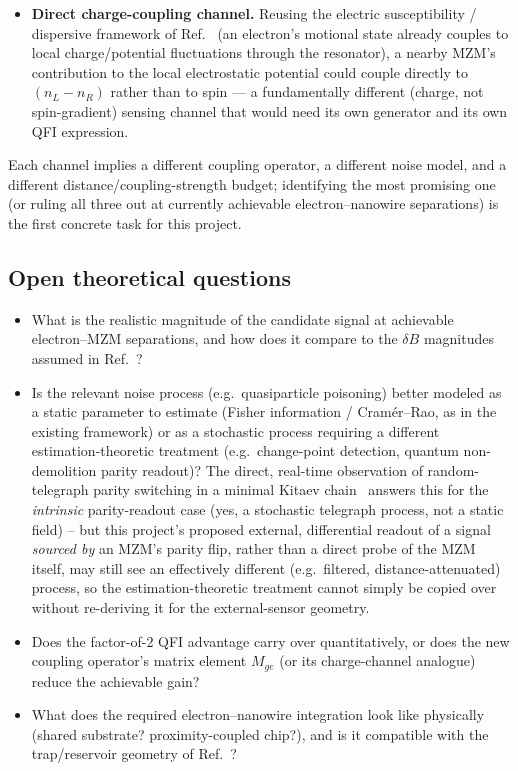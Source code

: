 \documentclass[aps,pra,reprint,superscriptaddress,longbibliography]{revtex4-2}
\begin{document}
\begin{itemize}
  distribution or edge current), this maps most directly onto the existing $\delta B$ channel and
  requires the smallest change to the Ref.~\cite{perruzza2026} formalism.
  \item \textbf{Direct charge-coupling channel.} Reusing the electric susceptibility / dispersive
  framework of Ref.~\cite{castoria2025} (an electron's motional state already couples to local
  charge/potential fluctuations through the resonator), a nearby MZM's contribution to the local
  electrostatic potential could couple directly to $(n_L - n_R)$ rather than to spin — a fundamentally
  different (charge, not spin-gradient) sensing channel that would need its own generator and its own
  QFI expression.
\end{itemize}

Each channel implies a different coupling operator, a different noise model, and a different
distance/coupling-strength budget; identifying the most promising one (or ruling all three out at
currently achievable electron--nanowire separations) is the first concrete task for this project.

\subsection{Open theoretical questions}

\begin{itemize}
  \item What is the realistic magnitude of the candidate signal at achievable electron--MZM
  separations, and how does it compare to the $\delta B$ magnitudes assumed in
  Ref.~\cite{perruzza2026}?
  \item Is the relevant noise process (e.g.\ quasiparticle poisoning) better modeled as a static
  parameter to estimate (Fisher information / Cram\'er--Rao, as in the existing framework) or as a
  stochastic process requiring a different estimation-theoretic treatment (e.g.\ change-point
  detection, quantum non-demolition parity readout)? The direct, real-time observation of random-
  telegraph parity switching in a minimal Kitaev chain~\cite{vanloo2026kitaev} answers this for the
  \emph{intrinsic} parity-readout case (yes, a stochastic telegraph process, not a static field) --
  but this project's proposed external, differential readout of a signal \emph{sourced by} an MZM's
  parity flip, rather than a direct probe of the MZM itself, may still see an effectively different
  (e.g.\ filtered, distance-attenuated) process, so the estimation-theoretic treatment cannot simply
  be copied over without re-deriving it for the external-sensor geometry.
  \item Does the factor-of-2 QFI advantage carry over quantitatively, or does the new coupling
  operator's matrix element $M_{ge}$ (or its charge-channel analogue) reduce the achievable gain?
  \item What does the required electron--nanowire integration look like physically (shared substrate?
  proximity-coupled chip?), and is it compatible with the trap/reservoir geometry of
  Ref.~\cite{castoria2025}?
\end{itemize}
\end{document}
